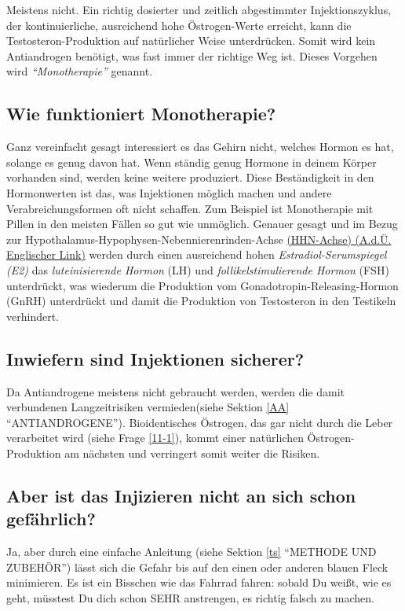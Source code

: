 \documentclass{article}
\begin{document}
{Meistens nicht. Ein richtig dosierter und zeitlich abgestimmter Injektionszyklus, der kontinuierliche, ausreichend hohe Östrogen-Werte erreicht, kann die Testosteron-Produktion auf natürlicher Weise unterdrücken. Somit wird kein Antiandrogen benötigt, was fast immer der richtige Weg ist. Dieses Vorgehen wird \textit{“Monotherapie”} genannt.

\subsection{Wie funktioniert Monotherapie?}\label{2-3}

Ganz vereinfacht gesagt interessiert es das Gehirn nicht, welches Hormon es hat, solange es genug davon hat. Wenn ständig genug Hormone in deinem Körper vorhanden sind, werden keine weitere produziert. Diese Beständigkeit in den Hormonwerten ist das, was Injektionen möglich machen und andere Verabreichungsformen oft nicht schaffen. Zum Beispiel ist Monotherapie mit Pillen in den meisten Fällen so gut wie unmöglich. Genauer gesagt und im Bezug zur Hypothalamus-Hypophysen-Nebennierenrinden-Achse \href{https://en.wikipedia.org/wiki/Hypothalamic-pituitary-gonadal_axis}{(HHN-Achse) (A.d.Ü. Englischer Link)} werden durch einen ausreichend hohen \textit{Estradiol-Serumspiegel (E2)} das \textit{luteinisierende Hormon} (LH) und \textit{follikelstimulierende Hormon} (FSH) unterdrückt, was wiederum die Produktion vom Gonadotropin-Releasing-Hormon (GnRH) unterdrückt und damit die Produktion von Testosteron in den Testikeln verhindert.

\subsection{Inwiefern sind Injektionen sicherer?}

Da Antiandrogene meistens nicht gebraucht werden, werden die damit verbundenen Langzeitrisiken vermieden(siehe Sektion \ref{AA} “ANTIANDROGENE”). Bioidentisches Östrogen, das gar nicht durch die Leber verarbeitet wird (siehe Frage \ref{11-1}), kommt einer natürlichen Östrogen-Produktion am nächsten und verringert somit weiter die Risiken.

\subsection{Aber ist das Injizieren nicht an sich schon gefährlich?}

Ja, aber durch eine einfache Anleitung (siehe Sektion \ref{ts} “METHODE UND ZUBEHÖR”) lässt sich die Gefahr bis auf den einen oder anderen blauen Fleck minimieren. Es ist ein Bisschen wie das Fahrrad fahren: sobald Du weißt, wie es geht, müsstest Du dich schon SEHR anstrengen, es richtig falsch zu machen.

}
\end{document}
